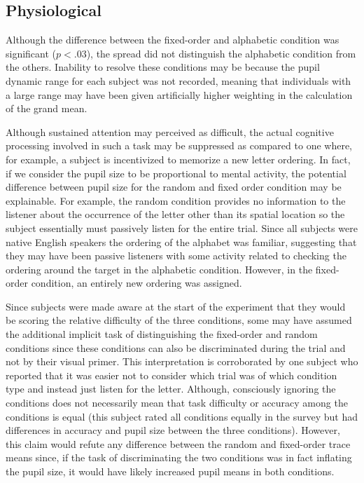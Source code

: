 \documentclass[10pt]{article}
\begin{document}
\subsection{Physiological}
Although the difference between the fixed-order and alphabetic
condition was significant ($p<.03$), the spread did not
distinguish the alphabetic condition from the others. Inability to resolve these conditions may be
because the
pupil dynamic range for each subject was not recorded, meaning that
individuals with a large range may have been given artificially higher
weighting in the calculation of the grand mean.

Although sustained attention may perceived as difficult, the
actual cognitive processing involved in such a task may
be suppressed as compared to one where, for example, a
subject is incentivized to memorize a new letter ordering.  In
fact, if we consider the pupil size to be proportional to
mental activity, the potential difference between pupil size
for the random and fixed order condition may be explainable.
For example, the random condition provides no information to
the listener about the occurrence of the letter other than its
spatial location so the subject essentially must passively
listen for the entire trial.  Since all subjects were native
English speakers the ordering of the alphabet was 
familiar, suggesting that they may have been passive listeners
with some activity related to checking the ordering around the
target in the alphabetic condition.  However, in the fixed-order condition, an entirely new ordering
was assigned.  

Since subjects were made aware at the start of the experiment that
they would be scoring the relative difficulty of the three
conditions, some may have assumed the additional implicit task of
distinguishing the fixed-order and random conditions since these
conditions can also be discriminated during the trial and not by
their visual primer.  
This interpretation is corroborated by
one subject who reported that it was easier
not to consider which trial was of which condition type and
instead just listen for the letter.  Although, consciously
ignoring the conditions does not necessarily mean that task
difficulty or accuracy among the conditions is equal (this
subject rated all conditions equally in the survey but had
differences in accuracy and pupil size between the three
conditions).
However, this claim would refute any
difference between the random and fixed-order trace means since, if
the task of discriminating the two conditions was in fact inflating
the pupil size, it would have likely increased pupil
means in both conditions. 
\end{document}
